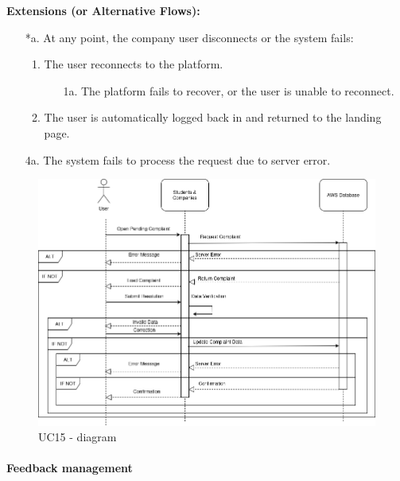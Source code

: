 \begin{itemize}[label={[\textbf{UC}]}, align=left, leftmargin=*]
    \textbf{Extensions (or Alternative Flows):} 
    \begin{enumerate}[label=\arabic*.]
        \item[*a.] At any point, the company user disconnects or the system fails:
            \begin{enumerate}[label=\arabic*.]
                \item The user reconnects to the platform.
                    \begin{enumerate}[label=\alph*.]
                        \item[1a.] The platform fails to recover, or the user is unable to reconnect.
                    \end{enumerate}
                 \item The user is automatically logged back in and returned to the landing page.
            \end{enumerate} 
        \item[4a.] The system fails to process the request due to server error.
        \end{enumerate}

\end{itemize}


     \begin{figure}[H]
    	\includegraphics[width=\textwidth,height=\textheight,keepaspectratio]{RASD-Latex/assets/Use Case Diagrams/UC15.png}
    	\caption{UC15 - diagram}
    	\label{fig:DataRequest}
    \end{figure}


\paragraph{Feedback management}

